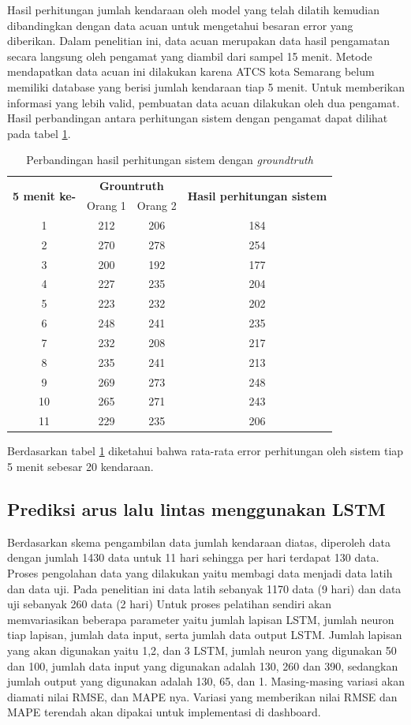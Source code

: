 \documentclass[conference]{IEEEtran}
\begin{document}
Hasil perhitungan jumlah kendaraan oleh model yang telah dilatih kemudian dibandingkan dengan data acuan untuk mengetahui besaran error yang diberikan. Dalam penelitian ini, data acuan merupakan data hasil pengamatan secara langsung oleh pengamat yang diambil dari sampel 15 menit.
Metode mendapatkan data acuan ini dilakukan karena ATCS kota Semarang belum memiliki database yang berisi jumlah kendaraan tiap 5 menit. Untuk memberikan informasi yang lebih valid, pembuatan data acuan dilakukan oleh dua pengamat.
Hasil perbandingan antara perhitungan sistem dengan pengamat dapat dilihat pada tabel \ref{Count_result}. 
\begin{table}[htp]
\centering
\begin{tabular}{|c|c|c|c|}
	\hline 
	\multirow{2}{*}{\textbf{5 menit ke-}} & \multicolumn{2}{c|}{\textbf{Grountruth}} &  \multirow{2}{*}{\textbf{Hasil perhitungan sistem}}\\ \cline{2-3}
	& Orang 1& Orang 2 &\\
	\hline
	1& 212 & 206 & 184\\
	2 & 270 & 278 & 254\\
	3 & 200 & 192 & 177\\
	4 & 227 & 235 & 204 \\
	5 & 223 & 232 & 202 \\
	6 & 248 & 241 & 235 \\
	7 & 232 & 208 & 217 \\
	8 & 235 & 241 & 213 \\
	9 & 269 & 273 & 248 \\
	10 & 265 & 271 & 243 \\
	11 & 229 & 235 & 206 \\
	\hline
\end{tabular}
\caption{Perbandingan hasil perhitungan sistem dengan \textit{groundtruth}}
\label{Count_result}
\end{table} 
Berdasarkan tabel \ref{Count_result} diketahui bahwa rata-rata error perhitungan oleh sistem tiap 5 menit sebesar 20 kendaraan.

\subsection{Prediksi arus lalu lintas menggunakan LSTM}
Berdasarkan skema pengambilan data jumlah kendaraan diatas, diperoleh data dengan jumlah 1430 data untuk 11 hari sehingga per hari terdapat 130 data.
Proses pengolahan data yang dilakukan yaitu membagi data menjadi data latih dan data uji. Pada penelitian ini data latih sebanyak 1170 data (9 hari) dan data uji sebanyak 260 data (2 hari)
Untuk proses pelatihan sendiri akan memvariasikan beberapa parameter yaitu jumlah lapisan LSTM, jumlah neuron tiap lapisan, jumlah data input, serta jumlah data output LSTM. 
Jumlah lapisan yang akan digunakan yaitu 1,2, dan 3 LSTM, jumlah neuron yang digunakan 50 dan 100, jumlah data input yang digunakan adalah 130, 260 dan 390, sedangkan jumlah output yang digunakan adalah 130, 65, dan 1. Masing-masing 
variasi akan diamati nilai RMSE, dan MAPE nya. Variasi yang memberikan nilai RMSE dan MAPE terendah akan dipakai untuk implementasi di dashboard.
\end{document}

